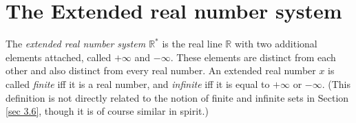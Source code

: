 \section{The Extended real number system}\label{sec 6.2}

\begin{definition}\label{6.2.1}
The \emph{extended real number system \(\mathds{R}^*\)} is the real line \(\mathds{R}\) with two additional elements attached, called \(+\infty\) and \(-\infty\).
These elements are distinct from each other and also distinct from every real number.
An extended real number \(x\) is called \emph{finite} iff it is a real number, and \emph{infinite} iff it is equal to \(+\infty\) or \(-\infty\).
(This definition is not directly related to the notion of finite and infinite sets in Section \ref{sec 3.6}, though it is of course similar in spirit.)
\end{definition}